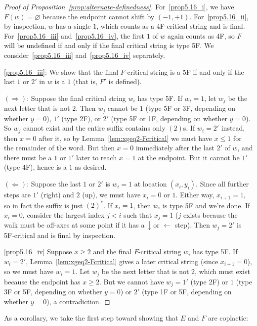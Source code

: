 \documentclass[ALCO,ThmDefs,Unicode,epreuves]{cedram}
\newcommand{\west}[1]{\ensuremath{\xleftarrow{\ #1\ }}}
\newcommand{\south}[1]{\ensuremath{\big \downarrow \!\text{\raisebox{.1ex}{\scriptsize $#1$}}}}
\begin{document}
\begin{proof}[Proof of Proposition~\ref{prop:alternate-definedness}]
For~\ref{prop5.16_i}, we have $F(w) = \varnothing$ because the endpoint cannot shift by $(-1,+1)$. For~\ref{prop5.16_ii}, by inspection, $w$ has a single $1$, which counts as a 4F-critical string and is final. For~\ref{prop5.16_iii} and~\ref{prop5.16_iv}, the first $1$ of $w$ again counts as 4F, so $F$ will be undefined if and only if the final critical string is type 5F. We consider~\ref{prop5.16_iii} and~\ref{prop5.16_iv} separately.

\ref{prop5.16_iii}: We show that the final $F$-critical string is a 5F if and only if the last $1$ or $2'$ in $w$ is a $1$ (that is, $F'$ is defined).

$(\Rightarrow)$: Suppose the final critical string $w_i$ has type 5F. If $w_i = 1$, let $w_j$ be the next letter that is not $2$. Then $w_j$ cannot be $1$ (type 5F or 3F, depending on whether $y=0$), $1'$ (type 2F), or $2'$ (type 5F or 1F, depending on whether $y=0$). So $w_j$ cannot exist and the entire suffix contains only $(2)$s. If $w_i = 2'$ instead, then $x=0$ after it, so by Lemma~\ref{lem:xgeq2-Fcritical} we must have $x \leq 1$ for the remainder of the word. But then $x=0$ immediately after the last $2'$ of $w$, and there must be a $1$ or $1'$ later to reach $x=1$ at the endpoint. But it cannot be $1'$ (type 4F), hence is a $1$ as desired. 

$(\Leftarrow)$: Suppose the last $1$ or $2'$ is $w_i = 1$ at location $(x_i,y_i)$. Since all further steps are $1'$ (right) and $2$ (up), we must have $x_i=0$ or $1$. Either way, $x_{i+1}=1$, so in fact the suffix is just $(2)^*$. If $x_i=1$, then $w_i$ is type 5F and we're done. If $x_i=0$, consider the largest index $j < i$ such that $x_j=1$ ($j$ exists because the walk must be off-axes at some point if it has a $\south{}$ or $\west{}$ step). Then $w_j = 2'$ is 5F-critical and is final by inspection.

\ref{prop5.16_iv} Suppose $x \geq 2$ and the final $F$-critical string $w_i$ has type 5F. If $w_i = 2'$, Lemma~\ref{lem:xgeq2-Fcritical} gives a later critical string (since $x_{i+1}=0$), so we must have $w_i = 1$. Let $w_j$ be the next letter that is not $2$, which must exist because the endpoint has $x \geq 2$. But we cannot have $w_j = 1'$ (type 2F) or $1$ (type 3F or 5F, depending on whether $y=0$) or $2'$ (type 1F or 5F, depending on whether $y=0$), a contradiction.
\end{proof}

As a corollary, we take the first step toward showing that $E$ and $F$ are coplactic:
\end{document}
